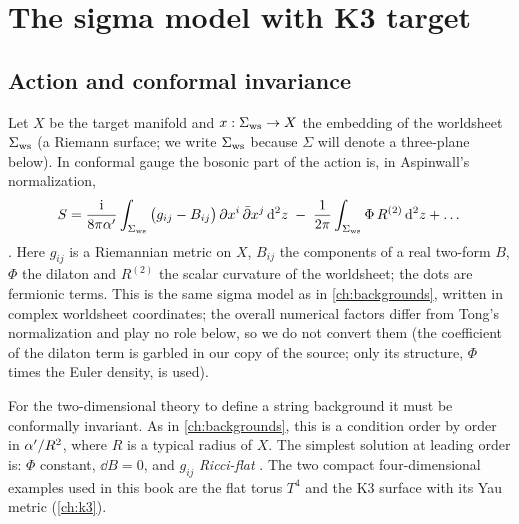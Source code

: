 \section{The sigma model with K3 target}\label{sec:stringsk3:sigma}

\subsection{Action and conformal invariance}
Let $X$ be the target manifold and $x:\Sigma_{\rm ws}\to X$ the embedding of the worldsheet
$\Sigma_{\rm ws}$ (a Riemann surface; we write $\Sigma_{\rm ws}$ because $\Sigma$ will
denote a three-plane below). In conformal gauge the bosonic part of the action is, in
Aspinwall's normalization,
\begin{equation}\label{eq:stringsk3:action}
  S=\frac{\mathrm{i}}{8\pi\alpha'}\int_{\Sigma_{\rm ws}}\big(g_{ij}-B_{ij}\big)\,
     \partial x^i\,\bar\partial x^j\,\mathrm{d}^2z\;-\;\frac{1}{2\pi}\int_{\Sigma_{\rm ws}}\Phi\,R^{(2)}\,\mathrm{d}^2z+\dots
\end{equation}
. Here $g_{ij}$ is a Riemannian metric on $X$,
$B_{ij}$ the components of a real two-form $B$, $\Phi$ the dilaton and $R^{(2)}$ the scalar
curvature of the worldsheet; the dots are fermionic terms. This is the same sigma model as
in \cref{ch:backgrounds}, written in complex worldsheet coordinates; the overall numerical
factors differ from Tong's normalization and play no role below, so we do not convert them
(the coefficient of the dilaton term is garbled in our copy of the source; only its
structure, $\Phi$ times the Euler density, is used).

For the two-dimensional theory to define a string background it must be conformally
invariant. As in \cref{ch:backgrounds}, this is a condition order by order in $\alpha'/R^2$, where
$R$ is a typical radius of $X$. The simplest solution at leading order is: $\Phi$ constant,
$\dd B=0$, and $g_{ij}$ \emph{Ricci-flat} . The two
compact four-dimensional examples used in this book are the flat torus $T^4$ and the K3
surface with its Yau metric (\cref{ch:k3}).

